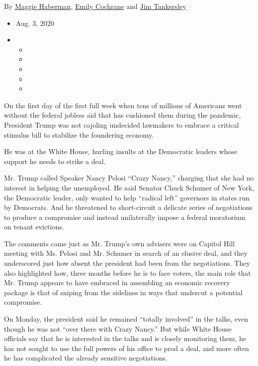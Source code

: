 By \href{https://www.nytimes3xbfgragh.onion/by/maggie-haberman}{Maggie
Haberman},
\href{https://www.nytimes3xbfgragh.onion/by/emily-cochrane}{Emily
Cochrane} and
\href{https://www.nytimes3xbfgragh.onion/by/jim-tankersley}{Jim
Tankersley}

\begin{itemize}
\item
  Aug. 3, 2020
\item
  \begin{itemize}
  \item
  \item
  \item
  \item
  \item
  \end{itemize}
\end{itemize}

On the first day of the first full week when tens of millions of
Americans went without the federal jobless aid that has cushioned them
during the pandemic, President Trump was not cajoling undecided
lawmakers to embrace a critical stimulus bill to stabilize the
foundering economy.

He was at the White House, hurling insults at the Democratic leaders
whose support he needs to strike a deal.

Mr. Trump called Speaker Nancy Pelosi ``Crazy Nancy,'' charging that she
had no interest in helping the unemployed. He said Senator Chuck Schumer
of New York, the Democratic leader, only wanted to help ``radical left''
governors in states run by Democrats. And he threatened to short-circuit
a delicate series of negotiations to produce a compromise and instead
unilaterally impose a federal moratorium on tenant evictions.

The comments came just as Mr. Trump's own advisers were on Capitol Hill
meeting with Ms. Pelosi and Mr. Schumer in search of an elusive deal,
and they underscored just how absent the president had been from the
negotiations. They also highlighted how, three months before he is to
face voters, the main role that Mr. Trump appears to have embraced in
assembling an economic recovery package is that of sniping from the
sidelines in ways that undercut a potential compromise.

On Monday, the president said he remained ``totally involved'' in the
talks, even though he was not ``over there with Crazy Nancy.'' But while
White House officials say that he is interested in the talks and is
closely monitoring them, he has not sought to use the full powers of his
office to prod a deal, and more often he has complicated the already
sensitive negotiations.

